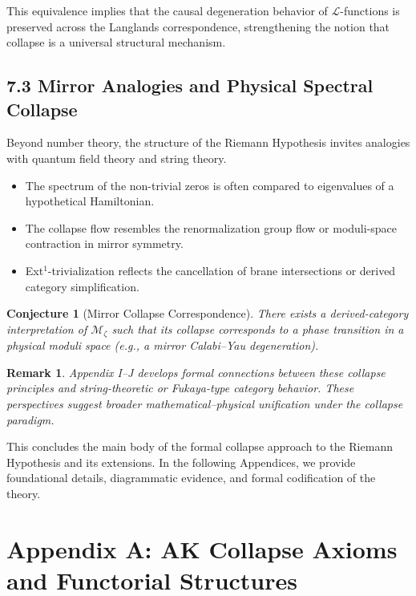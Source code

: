 \documentclass[11pt]{article}
\newtheorem{remark}[theorem]{Remark}
\newtheorem{conjecture}{Conjecture}[section]
\begin{document}
This equivalence implies that the causal degeneration behavior of $\mathcal{L}$-functions is preserved across the Langlands correspondence,  
strengthening the notion that collapse is a universal structural mechanism.

\subsection{7.3 Mirror Analogies and Physical Spectral Collapse}

Beyond number theory, the structure of the Riemann Hypothesis invites analogies with quantum field theory and string theory.

\begin{itemize}
    \item The spectrum of the non-trivial zeros is often compared to eigenvalues of a hypothetical Hamiltonian.
    \item The collapse flow resembles the renormalization group flow or moduli-space contraction in mirror symmetry.
    \item Ext$^1$-trivialization reflects the cancellation of brane intersections or derived category simplification.
\end{itemize}

\begin{conjecture}[Mirror Collapse Correspondence]
There exists a derived-category interpretation of $\mathcal{M}_\zeta$ such that its collapse corresponds to a phase transition in a physical moduli space  
(e.g., a mirror Calabi–Yau degeneration).
\end{conjecture}

\begin{remark}
Appendix I–J develops formal connections between these collapse principles and string-theoretic or Fukaya-type category behavior.  
These perspectives suggest broader mathematical–physical unification under the collapse paradigm.
\end{remark}

This concludes the main body of the formal collapse approach to the Riemann Hypothesis and its extensions.  
In the following Appendices, we provide foundational details, diagrammatic evidence, and formal codification of the theory.




\appendix

\section*{Appendix A: AK Collapse Axioms and Functorial Structures}
\end{document}
